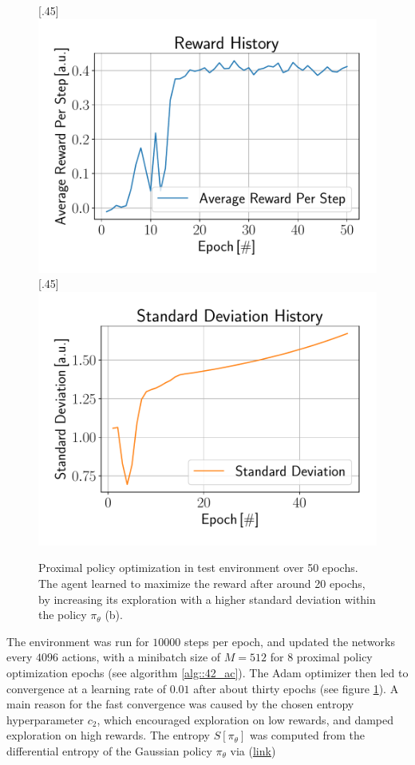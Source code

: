 \begin{figure}[h!]
	\centering
	[.45\linewidth]{\includegraphics[scale=.35]{chapters/11_autonomous_walking_experiments/img/ppo_reward_history.pdf}}	
	[.45\linewidth]{\includegraphics[scale=.35]{chapters/11_autonomous_walking_experiments/img/ppo_std_history.pdf}}
	\caption{Proximal policy optimization in test environment over 50 epochs. The agent learned to maximize the reward after around 20 epochs, by increasing its exploration with a higher standard deviation within the policy $\pi_\theta$ (b).}	
	\label{fig::1121_ppo_hist}
\end{figure}
The environment was run for $10000$ steps per epoch, and updated the networks every $4096$ actions, with a minibatch size of $M=512$ for $8$ proximal policy optimization epochs (see algorithm \ref{alg::42_ac}). The Adam optimizer then led to convergence at a learning rate of $0.01$ after about thirty epochs (see figure \ref{fig::1121_ppo_hist}). A main reason for the fast convergence was caused by the chosen entropy hyperparameter $c_2$, which encouraged exploration on low rewards, and damped exploration on high rewards. The entropy $S[\pi_\theta]$ was computed from the differential entropy of the Gaussian policy $\pi_\theta$ via (\href{https://github.com/mhubii/ppo_libtorch/blob/481c1e326dcd6220b2c1c955a0303a410c2cb0dd/Models.h#L82}{\underline{link}})
